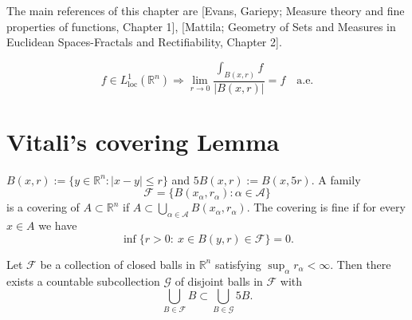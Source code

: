 \theoremstyle{definition}
\newtheorem*{claim}{Claim}

The main references of this chapter are [Evans, Gariepy; Measure theory and fine properties of functions, Chapter 1], [Mattila; Geometry of Sets and Measures in Euclidean Spaces-Fractals and Rectifiability, Chapter 2].

\begin{equation*}
f \in L_{\mathrm{loc}}^{1}(\mathbb{R}^{n})\Rightarrow \lim_{ r \to 0 } \frac{\int _{B(x,r)}f}{\lvert B(x,r) \rvert }=f\quad\text{a.e.}
\end{equation*}

\section{Vitali's covering Lemma}
\begin{definition}
$B(x,r):=\{ y\in \mathbb{R}^{n}:\lvert x-y \rvert\leq r \}$ and $5B(x,r):=B(x,5r)$. A family
$$\mathscr{F}=\{ B(x_{\alpha},r_{\alpha}):\alpha \in \mathcal{A} \}$$
is a covering of $A\subset\mathbb{R}^{n}$ if $A\subset \bigcup_{\alpha\in\mathcal{A}}B(x_{\alpha},r_{\alpha})$. The covering is fine if for every $x\in A$ we have
$$\inf\{ r>0:\ x\in B(y,r)\in\mathscr{F} \}=0.
$$
\end{definition}

\begin{theorem}\label{thm:Vitali}
Let $\mathscr{F}$ be a collection of closed balls in $\mathbb{R}^{n}$ satisfying $\sup_{\alpha}r_{\alpha}<\infty$. Then there exists a countable subcollection $\mathscr{G}$ of disjoint balls in $\mathscr{F}$ with
$$\bigcup _{B \in \mathscr{F}}B\subset \bigcup _{B\in \mathscr{G}}5B.
$$
\end{theorem}

